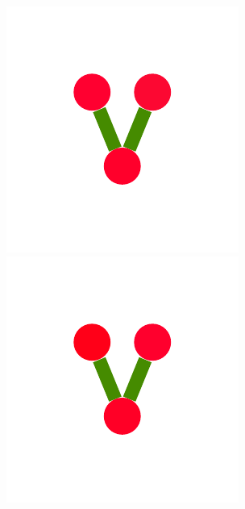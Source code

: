 \documentclass[a4paper,10pt]{article}
\begin{document}
\begin{figure}
{    \includegraphics[scale=.16]{./figures/6-5-tree-induced-8.pdf}
    \includegraphics[scale=.16]{./figures/6-5-tree-induced-9.pdf}
}
\end{figure}
\end{document}

